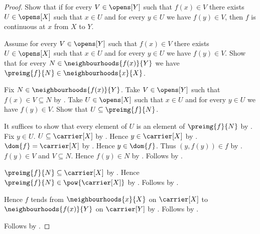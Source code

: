 \begin{proof}
    Show that if for every $V\in\opens[Y]$ such that $f(x)\in V$ there
        exists $U\in\opens[X]$ such that $x\in U$ and
        for every $y\in U$ we have $f(y)\in V$, then
        $f$ is continuous at $x$ from $X$ to $Y$.
    \begin{subproof}
        Assume for every $V\in\opens[Y]$ such that $f(x)\in V$ there
            exists $U\in\opens[X]$ such that $x\in U$ and
            for every $y\in U$ we have $f(y)\in V$.
        Show that for every $N\in\neighbourhoods{f(x)}{Y}$ we have
            $\preimg{f}{N}\in\neighbourhoods{x}{X}$.
        \begin{subproof}
            Fix $N\in\neighbourhoods{f(x)}{Y}$.
            Take $V\in\opens[Y]$ such that $f(x)\in V\subseteq N$ by
                .
            Take $U\in\opens[X]$ such that $x\in U$ and
                for every $y\in U$ we have $f(y)\in V$.
            Show that $U\subseteq\preimg{f}{N}$.
            \begin{subproof}
                It suffices to show that every element of $U$ is an element
                    of $\preimg{f}{N}$ by .
                Fix $y\in U$.
                $U\subseteq\carrier[X]$ by .
                Hence $y\in\carrier[X]$ by .
                $\dom{f}=\carrier[X]$ by .
                Hence $y\in\dom{f}$.
                Thus $(y,f(y))\in f$ by .
                $f(y)\in V$ and $V\subseteq N$.
                Hence $f(y)\in N$ by .
                Follows by .
            \end{subproof}
            $\preimg{f}{N}\subseteq\carrier[X]$ by
                .
            Hence $\preimg{f}{N}\in\pow{\carrier[X]}$ by
                .
            Follows by .
        \end{subproof}
        Hence $f$ tends from $\neighbourhoods{x}{X}$ on $\carrier[X]$ to
            $\neighbourhoods{f(x)}{Y}$ on $\carrier[Y]$ by
            .
        Follows by .
    \end{subproof}
    Follows by \auto.
\end{proof}

